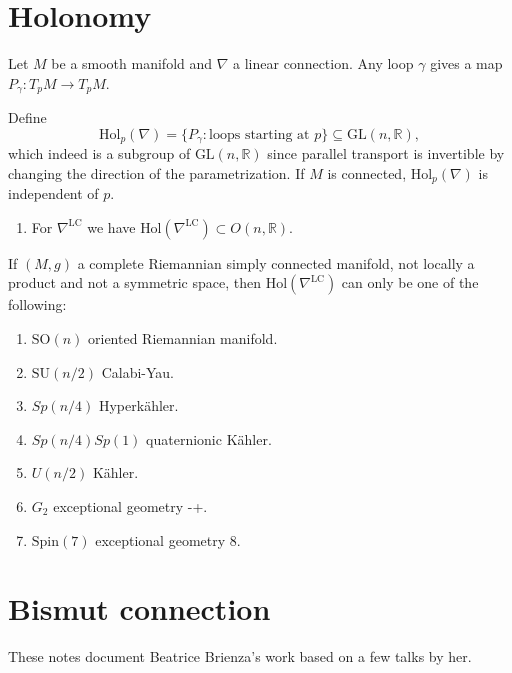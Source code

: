 \documentclass{book}
\begin{document}
\section{Holonomy}
\label{section-holonomy}

\noindent
Let $M$ be a smooth manifold
and $\nabla$ a linear connection.
Any loop $\gamma$ gives a map
$P_\gamma:T_pM \to T_pM$.

Define
$$
\text{Hol}_p(\nabla)
=\{P_\gamma:\text{loops starting at }p\}
\subseteq \text{GL}(n,\mathbb{R}),
$$
which indeed is a subgroup of
$\text{GL}(n,\mathbb{R})$
since parallel transport is invertible
by changing the direction of the
parametrization.
If $M$ is connected, $\text{Hol}_p(\nabla)$
is independent of $p$.

\begin{example}
\label{example-holonomy}
\begin{enumerate}
\item For $\nabla^{\text{LC}}$
we have $\text{Hol}(\nabla^{\text{LC}})
\subset O(n,\mathbb{R})$.

\end{enumerate}
\end{example}

\begin{theorem}[Berger, 1955]
\label{theorem-berger}
If $(M,g)$ a complete Riemannian
simply connected
manifold,
not locally a product
and not a symmetric space,
then $\text{Hol}(\nabla^{\text{LC}})$
can only be one of the following:
\begin{enumerate}
\item $\text{SO}(n)$ oriented Riemannian
manifold.
\item $\text{SU}(n/2)$ Calabi-Yau.
\item $Sp(n/4)$ Hyperkähler.
\item $Sp(n/4)Sp(1)$ quaternionic Kähler.
\item $U(n/2)$ Kähler.
\item $G_2$ exceptional geometry -+.
\item $\text{Spin}(7)$ exceptional
geometry 8.
\end{enumerate}
\end{theorem}

\section{Bismut connection}
\label{section-bistmuth}

\noindent
These notes document Beatrice Brienza's
work based on a few talks by her.
\end{document}

